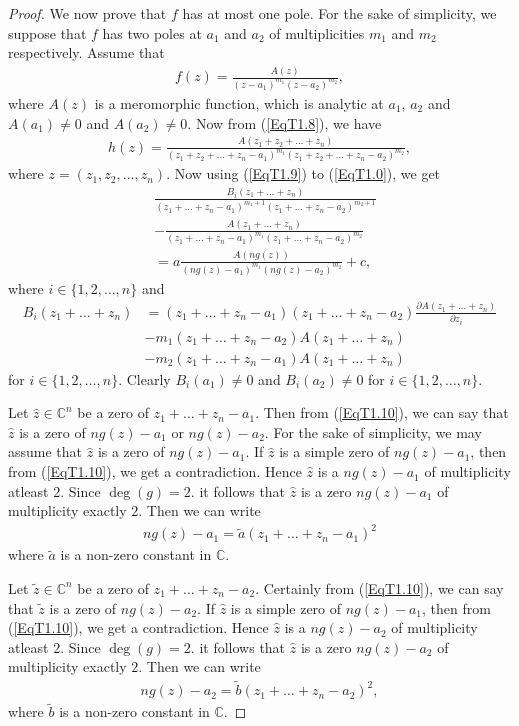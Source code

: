 \documentclass[10pt,a4paper]{amsart}
\begin{document}
\begin{proof}
We now prove that $f$ has at most one pole. For the sake of simplicity, we suppose that $f$ has two poles at $a_1$ and $a_2$ of multiplicities $m_1$ and $m_2$ respectively. Assume that 
\begin{align}\label{EqT1.8}
f(z)=\frac{A(z)}{(z-a_1)^{m_1}(z-a_2)^{m_2}},
\end{align}
where $A(z)$ is a meromorphic function, which is analytic at $a_1$, $a_2$ and $A(a_1)\neq 0$ and $A(a_2)\neq 0$. Now from (\ref{EqT1.8}), we have 
\begin{align}\label{EqT1.9}
h(z)=\frac{A(z_1+z_2+\ldots+z_n)}{(z_1+z_2+\ldots+z_n-a_1)^{m_1}(z_1+z_2+\ldots+z_n-a_2)^{m_2}},
\end{align}
where $z=(z_1,z_2,\ldots,z_n)$. Now using (\ref{EqT1.9}) to (\ref{EqT1.0}), we get
\begin{align}\label{EqT1.10}
&\frac{B_i(z_1+\ldots+z_n)}{(z_1+\ldots+z_n-a_1)^{m_1+1}(z_1+\ldots+z_n-a_2)^{m_2+1}}\\&-\frac{A(z_1+\ldots+z_n)}{(z_1+\ldots+z_n-a_1)^{m_1}(z_1+\ldots+z_n-a_2)^{m_2}}\nonumber\\&=
a\frac{A(ng(z))}{(ng(z)-a_1)^{m_1}(ng(z)-a_2)^{m_2}}+c,\nonumber
\end{align}
where $i\in\{1,2,\ldots,n\}$ and
\begin{align*}
B_i(z_1+\ldots+z_n)&=(z_1+\ldots+z_n-a_1)(z_1+\ldots+z_n-a_2)\frac{\partial A(z_1+\ldots+z_n)}{\partial z_i}\\&-m_1(z_1+\ldots+z_n-a_2)A(z_1+\ldots+z_n)\\&-m_2(z_1+\ldots+z_n-a_1)A(z_1+\ldots+z_n)
\end{align*}
for $i\in\{1,2,\ldots,n\}$. Clearly $B_i(a_1)\neq 0$ and $B_i(a_2)\neq 0$ for $i\in\{1,2,\ldots,n\}$.

Let $\hat z\in\mathbb{C}^n$ be a zero of $z_1+\ldots+z_n-a_1$. Then from (\ref{EqT1.10}), we can say that $\hat z$ is a zero of $ng(z)-a_1$ or $ng(z)-a_2$. For the sake of simplicity, we may assume that $\hat z$ is a zero of $ng(z)-a_1$. If $\hat z$ is a simple zero of $ng(z)-a_1$, then from (\ref{EqT1.10}), we get a contradiction. Hence $\hat z$ is a $ng(z)-a_1$ of multiplicity atleast $2$. Since $\deg(g)=2$. it follows that $\hat z$ is a zero $ng(z)-a_1$ of multiplicity exactly $2$. Then we can write 
\begin{align}\label{EqT1.11}
ng(z)-a_1=\tilde a\left(z_1+\ldots+z_n-a_1\right)^2
\end{align}
where $\tilde a$ is a non-zero constant in $\mathbb{C}$.

Let $\tilde z\in\mathbb{C}^n$ be a zero of $z_1+\ldots+z_n-a_2$. Certainly from (\ref{EqT1.10}), we can say that $\tilde z$ is a zero of $ng(z)-a_2$. If $\hat z$ is a simple zero of $ng(z)-a_1$, then from (\ref{EqT1.10}), we get a contradiction. Hence $\hat z$ is a $ng(z)-a_2$ of multiplicity atleast $2$. Since $\deg(g)=2$. it follows that $\hat z$ is a zero $ng(z)-a_2$ of multiplicity exactly $2$. Then we can write 
\begin{align}\label{EqT1.12}
ng(z)-a_2=\tilde b\left(z_1+\ldots+z_n-a_2\right)^2,
\end{align}
where $\tilde b$ is a non-zero constant in $\mathbb{C}$.


\end{proof}
\end{document}
